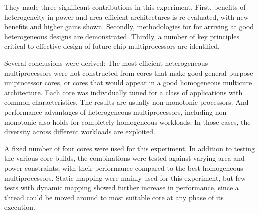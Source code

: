 They made three significant contributions in this experiment. 
First, benefits of heterogeneity in power and area efficient architectures is re-evaluated, with new benefits and higher gains shown.
Secondly, methodologies for for arriving at good heterogeneous designs are demonstrated.
Thirdly, a number of key principles critical to effective design of future chip multiprocessors are identified.

Several conclusions were derived:
The most efficient heterogeneous multiprocessors were not constructed from cores that make good general-purpose uniprocessor cores, or cores that would appear in a good homogeneous multicure architecture.
Each core was individually tuned for a class of applications with common characteristics.
The results are usually non-monotonic processors.
And performance advantages of heterogeneous multiprocessors, including non-monotonic also holds for completely homogeneous workloads.
In those cases, the diversity across different workloads are exploited.



A fixed number of four cores were used for this experiment.
In addition to testing the various core builds, the combinations were tested against varying area and power constraints, with their performance compared to the best homogeneous multiprocessors.
Static mapping were mainly used for this experiment, but few tests with dynamic mapping showed further increase in performance, since a thread could be moved around to most suitable core at any phase of its execution. 


